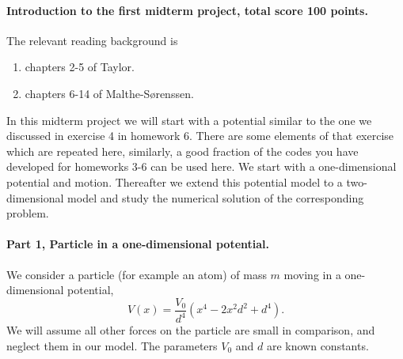 \documentclass[%
oneside,                 %
final,                   %
10pt]{article}
\begin{document}
\noindent
\paragraph{Introduction to the first midterm project, total score 100 points.}
The relevant reading background is
\begin{enumerate}
\item chapters 2-5 of Taylor.

\item chapters 6-14 of Malthe-Sørenssen.
\end{enumerate}

\noindent
In this midterm project we will start with a potential similar to the
one we discussed in exercise 4 in homework 6. There are some elements
of that exercise which are repeated here, similarly, a good fraction
of the codes you have developed for homeworks 3-6 can be used here.
We start with a one-dimensional potential and motion.  Thereafter we
extend this potential model to a two-dimensional model and study the
numerical solution of the corresponding problem.

\paragraph{Part 1, Particle in a one-dimensional  potential.}
We consider a particle (for example an atom) of mass $m$ moving in a one-dimensional potential,
\[
V(x)=\frac{V_0}{d^4}\left(x^4-2x^2d^2+d^4\right).
\]
We will assume all other forces on the particle are small in comparison, and neglect them in our model.  The parameters $V_0$ and $d$ are known constants. 
\end{document}
